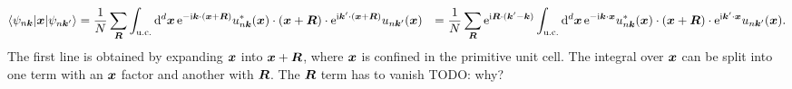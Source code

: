 \documentclass[hyperref, a4paper]{article}
\newcommand*{\ii}{\mathrm{i}}
\newcommand*{\ee}{\mathrm{e}}
\def\\{}%
\begin{document}
\begin{equation}
    \begin{aligned}
        \mel**{\psi_{n \vb*{k}}}{\vb*{x}}{\psi_{n \vb*{k}'}}
        &= \frac{1}{N} \sum_{\vb*{R}} \int_{\text{u.c.}} \dd[d]{\vb*{x}} 
        \ee^{- \ii \vb*{k} \cdot (\vb*{x} + \vb*{R})} u^*_{n \vb*{k}}(\vb*{x})
        \cdot (\vb*{x} + \vb*{R}) \cdot 
        \ee^{\ii \vb*{k}' \cdot (\vb*{x} + \vb*{R})} u_{n \vb*{k}'}(\vb*{x}) \\
        &= \frac{1}{N} \sum_{\vb*{R}} \ee^{\ii \vb*{R} \cdot (\vb*{k}' - \vb*{k})}
        \int_{\text{u.c.}} \dd[d]{\vb*{x}} 
        \ee^{- \ii \vb*{k} \cdot \vb*{x} } u^*_{n \vb*{k}}(\vb*{x})
        \cdot (\vb*{x} + \vb*{R}) \cdot 
        \ee^{\ii \vb*{k}' \cdot \vb*{x} } u_{n \vb*{k}'}(\vb*{x})  .
    \end{aligned}
    \label{eq:erE-inter-1}
\end{equation}
The first line is obtained by expanding $\vb*{x}$ into $\vb*{x} + \vb*{R}$, 
where $\vb*{x}$ is confined in the primitive unit cell. 
The integral over $\vb*{x}$ can be split into one term with
an $\vb*{x}$ factor and another with $\vb*{R}$. 
The $\vb*{R}$ term has to vanish TODO: why? 
\end{document}
